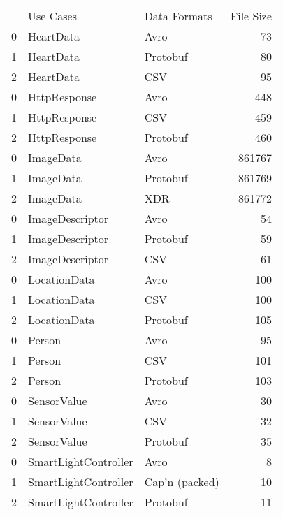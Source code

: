 \begin{tabular}{lllr}
 & Use Cases & Data Formats & File Size \\
0 & HeartData & Avro & 73 \\
1 & HeartData & Protobuf & 80 \\
2 & HeartData & CSV & 95 \\
0 & HttpResponse & Avro & 448 \\
1 & HttpResponse & CSV & 459 \\
2 & HttpResponse & Protobuf & 460 \\
0 & ImageData & Avro & 861767 \\
1 & ImageData & Protobuf & 861769 \\
2 & ImageData & XDR & 861772 \\
0 & ImageDescriptor & Avro & 54 \\
1 & ImageDescriptor & Protobuf & 59 \\
2 & ImageDescriptor & CSV & 61 \\
0 & LocationData & Avro & 100 \\
1 & LocationData & CSV & 100 \\
2 & LocationData & Protobuf & 105 \\
0 & Person & Avro & 95 \\
1 & Person & CSV & 101 \\
2 & Person & Protobuf & 103 \\
0 & SensorValue & Avro & 30 \\
1 & SensorValue & CSV & 32 \\
2 & SensorValue & Protobuf & 35 \\
0 & SmartLightController & Avro & 8 \\
1 & SmartLightController & Cap'n (packed) & 10 \\
2 & SmartLightController & Protobuf & 11 \\
\end{tabular}

